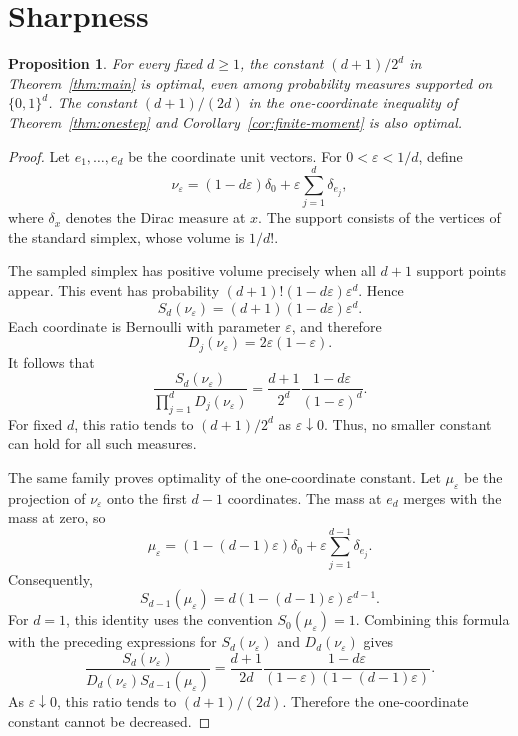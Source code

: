 \documentclass[11pt]{article}
\newtheorem{proposition}[theorem]{Proposition}
\theoremstyle{remark}
\begin{document}
\section{Sharpness}
\label{sec:sharpness}
\begin{aiblock}




\begin{proposition}
For every fixed $d\geq1$, the constant $(d+1)/2^d$ in
Theorem~\ref{thm:main} is optimal, even among probability measures
supported on $\{0,1\}^d$. The constant $(d+1)/(2d)$ in the one-coordinate inequality of Theorem~\ref{thm:onestep} and Corollary~\ref{cor:finite-moment} is also optimal.
\end{proposition}

\begin{proof}

Let $e_1,\ldots,e_d$ be the coordinate unit vectors. For $0<\varepsilon<1/d$, define
$$
\nu_\varepsilon
=(1-d\varepsilon)\delta_0
+\varepsilon\sum_{j=1}^d\delta_{e_j},
$$
where $\delta_x$ denotes the Dirac measure at $x$. The support consists of the vertices of the standard simplex, whose volume is $1/d!$.


The sampled simplex has positive volume precisely when all $d+1$
support points appear. This event has probability
$(d+1)!(1-d\varepsilon)\varepsilon^d$. Hence
$$S_d(\nu_\varepsilon)=(d+1)(1-d\varepsilon)\varepsilon^d.$$
Each coordinate is Bernoulli with parameter $\varepsilon$, and therefore
$$D_j(\nu_\varepsilon)=2\varepsilon(1-\varepsilon).$$
It follows that
$$\frac{S_d(\nu_\varepsilon)}{\prod_{j=1}^dD_j(\nu_\varepsilon)}=\frac{d+1}{2^d}\frac{1-d\varepsilon}{(1-\varepsilon)^d}.$$
For fixed $d$, this ratio tends to $(d+1)/2^d$ as
$\varepsilon\downarrow0$. Thus, no smaller constant can hold for all
such measures.

The same family proves optimality of the one-coordinate constant. Let $\mu_\varepsilon$ be the projection of $\nu_\varepsilon$ onto the first
$d-1$ coordinates. The mass at $e_d$ merges with the mass at zero, so
$$
\mu_\varepsilon=(1-(d-1)\varepsilon)\delta_0+\varepsilon\sum_{j=1}^{d-1}\delta_{e_j}.
$$
Consequently,
$$
S_{d-1}(\mu_\varepsilon)=d(1-(d-1)\varepsilon)\varepsilon^{d-1}.
$$
For $d=1$, this identity uses the convention $S_0(\mu_\varepsilon)=1$. Combining this formula with the preceding expressions for $S_d(\nu_\varepsilon)$ and $D_d(\nu_\varepsilon)$ gives
$$
\frac{S_d(\nu_\varepsilon)}{D_d(\nu_\varepsilon)S_{d-1}(\mu_\varepsilon)}
=\frac{d+1}{2d}\frac{1-d\varepsilon}{(1-\varepsilon)(1-(d-1)\varepsilon)}.
$$
As $\varepsilon\downarrow0$, this ratio tends to $(d+1)/(2d)$. Therefore the one-coordinate constant cannot be decreased.
\end{proof}



\end{aiblock}
\end{document}
